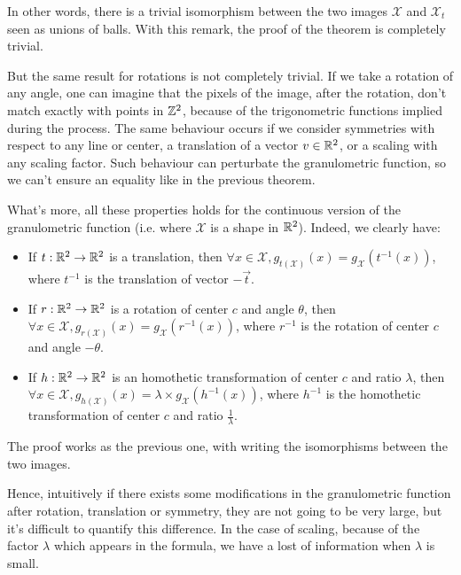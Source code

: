 In other words, there is a trivial isomorphism between the two images $\mathcal{X}$ and  $\mathcal{X}_t$ seen as unions of balls. With this remark, the proof of the theorem is completely trivial.

But the same result for rotations is not completely trivial. If we take a rotation of any angle, one can imagine that the pixels of the image, after the rotation, don't match exactly with points in $\mathbb{Z}^{2}$, because of the trigonometric functions implied during the process. The same behaviour occurs if we consider symmetries with respect to any line or center, a translation of a vector $v \in \mathbb{R}^2$, or a scaling with any scaling factor. Such behaviour can perturbate the granulometric function, so we can't ensure an equality like in the previous theorem.


What's more, all these properties holds for the continuous version of the granulometric function (i.e. where $\mathcal{X}$ is a shape in $\mathbb{R}^2$). Indeed, we clearly have:

\begin{remarque}
	\begin{itemize}
		\item If $t : \mathbb{R}^2 \to \mathbb{R}^2$ is a translation, then $\forall x \in \mathcal{X}, g_{t(\mathcal{X})}(x) = g_{\mathcal{X}}(t^{-1}(x))$, where $t^{-1}$ is the translation of vector $-\vec{t}$.
		\item If $r : \mathbb{R}^2 \to \mathbb{R}^2$ is a rotation of center $c$ and angle $\theta$, then $\forall x \in \mathcal{X}, g_{r(\mathcal{X})}(x) = g_{\mathcal{X}}(r^{-1}(x))$, where $r^{-1}$ is the rotation of center $c$ and angle $-\theta$. 
		\item If $h : \mathbb{R}^2 \to \mathbb{R}^2$ is an homothetic transformation of center $c$ and ratio $\lambda$, then $\forall x \in \mathcal{X}, g_{h(\mathcal{X})}(x) = \lambda \times g_{\mathcal{X}}(h^{-1}(x))$, where $h^{-1}$ is the homothetic transformation of center $c$ and ratio $\frac{1}{\lambda}$.
	\end{itemize}
\end{remarque}

The proof works as the previous one, with writing the isomorphisms between the two images.

Hence, intuitively if there exists some modifications in the granulometric function after rotation, translation or symmetry, they are not going to be very large, but it's difficult to quantify this difference. In the case of scaling, because of the factor $\lambda$ which appears in the formula, we have a lost of information when $\lambda$ is small.

